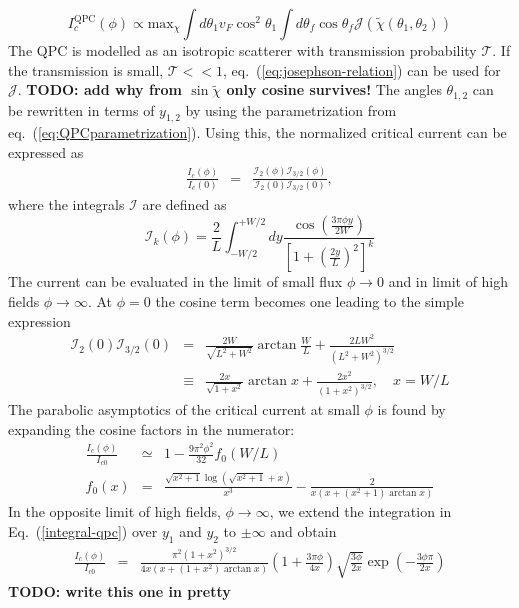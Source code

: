 \begin{equation}
I_c^{\text{QPC}}(\phi) \propto \text{max}_{\chi} \int d \theta_1 v_F \cos^2 \theta_1 \int d \theta_f \cos \theta_f \mathcal{J}\left( \tilde{\chi} (\theta_1, \theta_2) \right)
\end{equation}
The QPC is modelled as an isotropic scatterer with transmission probability $\mathcal{T}$. If the transmission is small, $\mathcal{T} << 1$, eq.~(\ref{eq:josephson-relation}) can be used for $\mathcal{J}$.
\textbf{TODO: add why from $\sin \tilde{\chi}$ only cosine survives!}
The angles $\theta_{1, 2}$ can be rewritten in terms of $y_{1, 2}$ by using the parametrization from eq.~(\ref{eq:QPCparametrization}). Using this, the normalized critical current can be expressed as
\begin{eqnarray}
\frac{I_c(\phi)}{I_c(0)} &=& \frac{\mathcal{I}_2(\phi)\mathcal{I}_{3/2}(\phi)}{\mathcal{I}_2(0)\mathcal{I}_{3/2}(0)},
\end{eqnarray}
where the integrals $\mathcal{I}$ are defined as
\begin{equation}
\mathcal{I}_k(\phi) = \frac{2}{L}\int_{-W/2}^{+W/2}dy \frac{\cos\left(\frac{3\pi\phi y}{2W}\right)}{\left[1 + \left(\frac{2y}{L}\right)^2 \right]^k}
\label{integral-qpc}
\end{equation}
The current can be evaluated in the limit of small flux $\phi \rightarrow 0$ and in limit of high fields $\phi \rightarrow \infty$. 
At $\phi=0$ the cosine term becomes one leading to the simple expression
\begin{eqnarray}
\mathcal{I}_2(0)\mathcal{I}_{3/2}(0) &=&
\frac{2 W}{\sqrt{L^2+W^2}}\arctan\frac{W}{L} + \frac{2 L W^2}{(L^2+W^2)^{3/2}} \\
&\equiv& \frac{2x}{\sqrt{1 + x^2}} \arctan x + \frac{2 x^2}{\left( 1 + x^2 \right)^{3/2}}, \quad x = W/L
\label{Ic-0}
\end{eqnarray}
The parabolic asymptotics of the critical current at small $\phi$ is found by expanding the cosine factors in the numerator:
\begin{eqnarray}
\frac{I_c(\phi)}{I_{c0}}&\simeq& 1 - \frac{9\pi ^2 \phi^2 }{32} f_0(W/L) \\
f_0(x) &=& \frac{\sqrt{x^2+1} \log \left(\sqrt{x^2+1}+x\right)}{x^3} - \frac{2}{x (x+(x^2+1) \arctan x)} 
\end{eqnarray}
In the opposite limit of high fields, $\phi\to \infty$, we extend the integration in Eq.~(\ref{integral-qpc}) over $y_1$ and $y_2$ to $\pm \infty$ and obtain
\begin{eqnarray}
\frac{I_c(\phi)}{I_{c0}} &=& \frac{\pi^2 \left(1+x^2\right)^{3/2}}{4x\left(x + \left(1+x^2\right)\arctan x\right)}\left(1 + \frac{3 \pi \phi }{4 x} \right) \sqrt{\frac{3 \phi}{2x}}\exp\left(-\frac{3\phi\pi}{2x}\right)
\label{large-phi}
\end{eqnarray}
\textbf{TODO: write this one in pretty}

